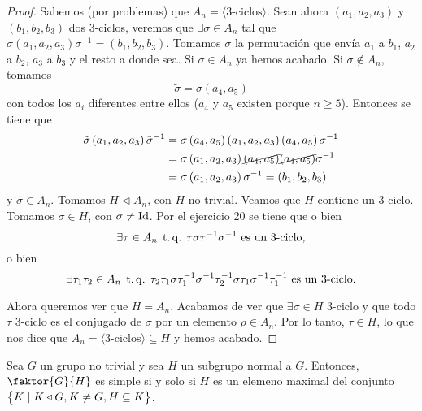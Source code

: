 \begin{proof}
    Sabemos (por problemas) que $A_n = \langle \text{3-ciclos}\rangle$. Sean ahora
    $\left( a_1, a_2, a_3 \right)$ y $\left( b_1, b_2, b_3 \right)$ dos 3-ciclos, veremos que
    $\exists \sigma \in A_n$ tal que
    $\sigma \left( a_1, a_2, a_3 \right) \sigma^{-1} = \left( b_1, b_2, b_3 \right)$. Tomamos
    $\sigma$ la permutación que envía $a_1$ a $b_1$, $a_2$ a $b_2$, $a_3$ a $b_3$ y el resto a donde sea.
    Si $\sigma \in A_n$ ya hemos acabado. Si $\sigma \notin A_n$, tomamos
    \[
        \tilde{\sigma} = \sigma \left( a_4, a_5 \right)
    \]
    con todos los $a_{i}$ diferentes entre ellos ($a_4$ y $a_5$ existen porque $n \geq 5$). Entonces se tiene que
    \[
        \begin{aligned}
            \tilde{\sigma} \left( a_1, a_2, a_3 \right) \tilde{\sigma}^{-1} &=
            \sigma \left( a_4, a_5 \right) \left( a_1, a_2, a_3 \right) \left( a_4, a_5 \right) \sigma^{-1} \\
            &= \sigma \left( a_1, a_2, a_3 \right) \cancel{\left( a_4, a_5 \right)}
            \cancel{\left( a_4, a_5 \right)} \sigma^{-1} \\
            &= \sigma\left( a_1, a_2, a_3 \right)\sigma^{-1} = \left( b_1, b_2, b_3 \right)
        \end{aligned}
    \]
    y $\tilde{\sigma} \in A_n$. Tomamos $H \triangleleft A_n$,  con $H$ no trivial. Veamos que $H$ contiene un 3-ciclo. Tomamos 
    $\sigma \in H$, con $\sigma \neq \operatorname{Id}$. Por el ejercicio 20 se tiene que o bien
    \[
            \exists \tau \in A_n \operatorname{\;t.q.\;} \tau \sigma \tau^{-1} \sigma^{-1} \text{ es un 3-ciclo},
    \]
    o bien
    \[
        \exists \tau_1 \tau_2 \in A_n \operatorname{\;t.q.\;} \tau_2 \tau_1\sigma\tau_1^{-1}\sigma^{-1}\tau_2^{-1}
            \sigma\tau_1\sigma^{-1}\tau_1^{-1} \text{ es un 3-ciclo}.
    \]

    \noindent Ahora queremos ver que $H = A_n$. Acabamos de ver que $\exists \sigma \in H$ 3-ciclo y que todo $\tau$ 3-ciclo es el conjugado de $\sigma$
    por un elemento $\rho\in A_n$. Por lo tanto, $\tau\in H$, lo que nos dice que $A_n=\langle\text{3-ciclos}\rangle \subseteq H$ y hemos acabado.
\end{proof}

\begin{lema}\label{lema:maximal_normal}
    Sea $G$ un grupo no trivial y sea $H$ un subgrupo normal a $G$. Entonces, $\faktor{G}{H}$ es simple si y solo si $H$ es un elemeno maximal del conjunto $\left\{ K\mid K\triangleleft G, K\neq G, H\subseteq K\right\}$.
\end{lema}

